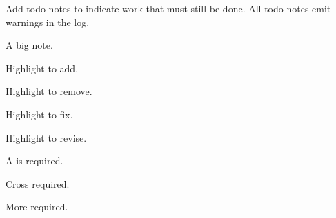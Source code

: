 \documentclass[10pt,titlepage]{article}
\begin{document}
Add todo notes to indicate work that must still be done.
All todo notes emit warnings in the log.

\begin{example}
\begin{todo}
  A big note.
\end{todo}
\end{example}

\begin{example}
Highlight  to add.
\todoadd{}
\end{example}

\begin{example}
Highlight  to remove.
\todoremove{}
\end{example}

\begin{example}
Highlight  to fix.
\todofix{}
\end{example}

\begin{example}
Highlight  to revise.
\todorevise{}
\end{example}

\begin{example}
A  is required.
\todocite{}
\end{example}

\begin{example}
Cross  required.
\todoref{}
\end{example}

\begin{example}
More  required.
\todomore{}
\end{example}

\begin{example}
\todosentence
\end{example}

\begin{example}
\todopar
\end{example}

{
\begin{example}
\todobox
\end{example}
}

\makeatletter
\let\@stz@warning\old@stz@warning
\let\old@stz@warning\undefined
\makeatother
\end{document}
